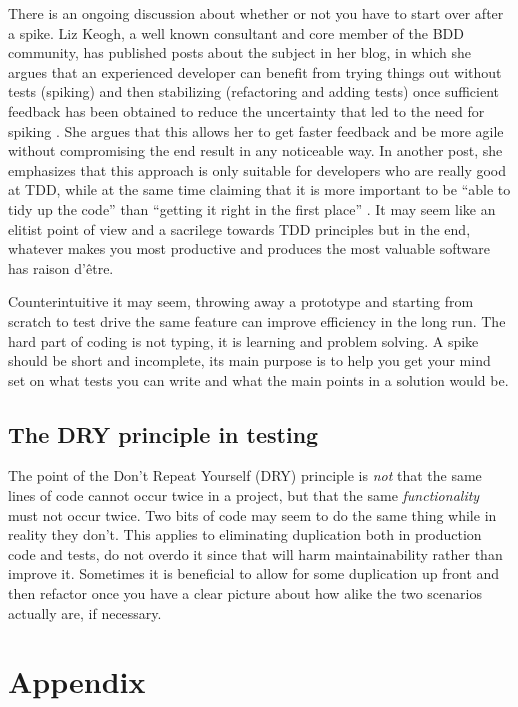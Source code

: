 \documentclass[11pt]{article}
\begin{document}
There is an ongoing discussion about whether or not you have to start over after a spike. Liz Keogh, a well known consultant and core member of the BDD community, has published posts about the subject in her blog, in which she argues that an experienced developer can benefit from trying things out without tests (spiking) and then stabilizing (refactoring and adding tests) once sufficient feedback has been obtained to reduce the uncertainty that led to the need for spiking \cite{Liz1}. She argues that this allows her to get faster feedback and be more agile without compromising the end result in any noticeable way. In another post, she emphasizes that this approach is only suitable for developers who are really good at TDD, while at the same time claiming that it is more important to be ``able to tidy up the code'' than ``getting it right in the first place'' \cite{Liz2}. It may seem like an elitist point of view and a sacrilege towards TDD principles but in the end, whatever makes you most productive and produces the most valuable software has raison d'être.

Counterintuitive it may seem, throwing away a prototype and starting from scratch to test drive the same feature can improve efficiency in the long run. The hard part of coding is not typing, it is learning and problem solving. A spike should be short and incomplete, its main purpose is to help you get your mind set on what tests you can write and what the main points in a solution would be. \cite[question~60]{Edelstam}

\subsection{The DRY principle in testing}

The point of the Don't Repeat Yourself (DRY) principle is \emph{not} that the same lines of code cannot occur twice in a project, but that the same \emph{functionality} must not occur twice. Two bits of code may seem to do the same thing while in reality they don't. This applies to eliminating duplication both in production code and tests, do not overdo it since that will harm maintainability rather than improve it. Sometimes it is beneficial to allow for some duplication up front and then refactor once you have a clear picture about how alike the two scenarios actually are, if necessary. \cite[questions~69-70]{Edelstam}

\printbibliography[heading=bibnumbered]

\section{Appendix}
\end{document}
